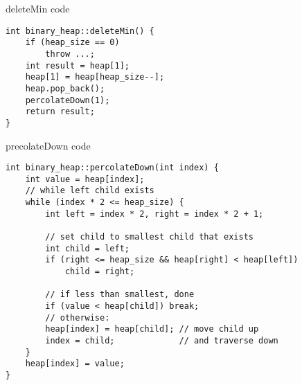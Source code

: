 \begin{frame}[fragile,label=deleteCode]{deleteMin code}
\lstset{language=C++,style=small}
\begin{lstlisting}
int binary_heap::deleteMin() {
    if (heap_size == 0)
        throw ...;
    int result = heap[1];
    heap[1] = heap[heap_size--];
    heap.pop_back();
    percolateDown(1);
    return result;
}
\end{lstlisting}
\end{frame}

\begin{frame}[fragile,label=percolateDownCode]{precolateDown code}
\lstset{language=C++,style=smaller}
\begin{lstlisting}
int binary_heap::percolateDown(int index) {
    int value = heap[index];
    // while left child exists
    while (index * 2 <= heap_size) {
        int left = index * 2, right = index * 2 + 1;

        // set child to smallest child that exists
        int child = left;
        if (right <= heap_size && heap[right] < heap[left])
            child = right;

        // if less than smallest, done
        if (value < heap[child]) break;
        // otherwise:
        heap[index] = heap[child]; // move child up
        index = child;             // and traverse down
    }
    heap[index] = value;
}
\end{lstlisting}
\end{frame}
